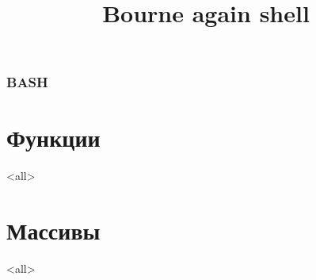 
\title[bash]{Bourne again shell}




\begin{frame}
	\frametitle{BASH}
	\titlepage
	\vspace{-0.5cm}
	\begin{center}
	\end{center}
\end{frame}

\begin{frame}
	\tableofcontents
\end{frame}



\section{Функции}

\mode<all>{}

\section{Массивы}

\mode<all>{}





